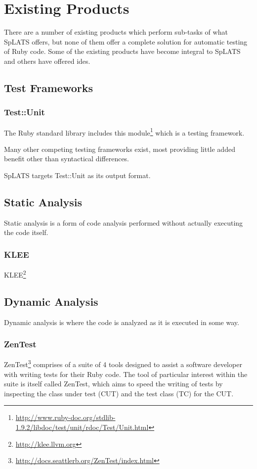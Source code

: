 \chapter{Existing Products}

There are a number of existing products which perform sub-tasks of what SpLATS offers, but none of them offer a complete solution for automatic testing of Ruby code. Some of the existing products have become integral to SpLATS and others have offered ides.

\section{Test Frameworks}

  \subsection{Test::Unit}
    The Ruby standard library includes this
module\footnote{\url{http://www.ruby-doc.org/stdlib-1.9.2/libdoc/test/unit/rdoc/Test/Unit.html}}
which is a testing framework.

Many other competing testing frameworks exist, most providing little added
benefit other than syntactical differences.

SpLATS targets Test::Unit as its output format.

\section{Static Analysis}

  Static analysis is a form of code analysis performed without actually executing the code itself.

  \subsection{KLEE}
    KLEE\footnote{\url{http://klee.llvm.org}}

\section{Dynamic Analysis} 

  Dynamic analysis is where the code is analyzed as it is executed in some way.

  \subsection{ZenTest}
    ZenTest\footnote{\url{http://docs.seattlerb.org/ZenTest/index.html}}
comprises of a suite of 4 tools designed to assist a software developer with
writing tests for their Ruby code. The tool of particular interest within the suite is itself called ZenTest,
which aims to speed the writing of tests by inspecting the class under test (CUT)
and the test class (TC) for the CUT.


